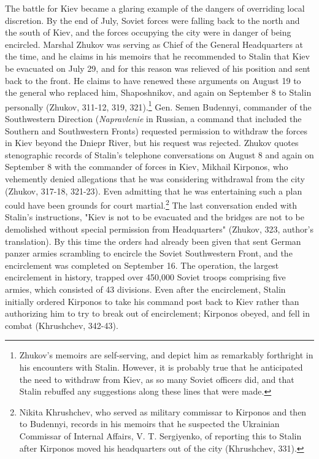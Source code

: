 \documentclass[11pt,]{article}
\begin{document}
The battle for Kiev became a glaring example of the dangers of overriding local discretion.  By the end of July, Soviet forces were falling back to the north and the south of Kiev, and the forces occupying the city were in danger of being encircled.  Marshal Zhukov was serving as Chief of the General Headquarters at the time, and he claims in his memoirs that he recommended to Stalin that Kiev be evacuated on July 29, and for this reason was relieved of his position and sent back to the front.  He claims to have renewed these arguments on August 19 to the general who replaced him, Shaposhnikov, and again on September 8 to Stalin personally (Zhukov, 311-12, 319, 321).\footnote{Zhukov's memoirs are self-serving, and depict him as remarkably forthright in his encounters with Stalin. However, it is probably true that he anticipated the need to withdraw from Kiev, as so many Soviet officers did, and that Stalin rebuffed any suggestions along these lines that were made.}  Gen. Semen Budennyi, commander of the Southwestern Direction (\textit{Napravlenie} in Russian, a command that included the Southern and Southwestern Fronts) requested permission to withdraw the forces in Kiev beyond the Dniepr River, but his request was rejected.  Zhukov  quotes stenographic records of Stalin's telephone conversations on August 8 and again on September 8 with the commander of forces in Kiev, Mikhail Kirponos, who vehemently denied allegations that he was considering withdrawal from the city (Zhukov, 317-18, 321-23).  Even admitting that he was entertaining such a plan could have been grounds for court martial.\footnote{Nikita Khrushchev, who served as military commissar to Kirponos and then to Budennyi, records in his memoirs that he suspected the Ukrainian Commissar of Internal Affairs, V. T. Sergiyenko, of reporting this to Stalin after Kirponos moved his headquarters out of the city (Khrushchev, 331).}  The last conversation ended with Stalin's instructions, "Kiev is not to be evacuated and the bridges are not to be demolished without special permission from Headquarters" (Zhukov, 323, author's translation).  By this time the orders had already been given that sent German panzer armies scrambling to encircle the Soviet Southwestern Front, and the encirclement was completed on September 16.  The operation, the largest encirclement in history, trapped over 450,000 Soviet troops comprising five armies, which consisted of 43 divisions.  Even after the encirclement, Stalin initially ordered Kirponos to take his command post back to Kiev rather than authorizing him to try to break out of encirclement; Kirponos obeyed, and fell in combat (Khrushchev, 342-43). 
\end{document}
